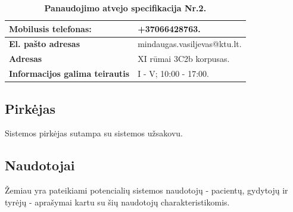 \documentclass[12pt]{article}
\begin{document}
\begin{table}[htb!]
    \captionsetup{justification=centering}
    \caption{\small\textbf{Panaudojimo atvejo specifikacija Nr.2.}}
    \begin{tabular}{|m{6cm}|m{11cm}|}
        \hline
        \raggedleft \textbf{\cellcolor{deepchampagne}Mobilusis telefonas:} &
        +37066428763. \\
        \hline
        \raggedleft \textbf{\cellcolor{deepchampagne}El. pašto adresas} &
        mindaugas.vasiljevas@ktu.lt. \\
        \hline
        \raggedleft \textbf{\cellcolor{deepchampagne}Adresas} & 
        XI rūmai 3C2b korpusas. \\
        \hline
        \raggedleft \textbf{\cellcolor{deepchampagne}Informacijos galima teirautis}
        & I - V; 10:00 - 17:00. \\
        \hline
    \end{tabular}
    \label{table:kontaktiniai_duomenys}
\end{table}

\subsection{Pirkėjas}
Sistemos pirkėjas sutampa su sistemos užsakovu.

\subsection{Naudotojai}
Žemiau yra pateikiami potencialių sistemos naudotojų - pacientų, gydytojų ir
tyrėjų - aprašymai kartu su šių naudotojų charakteristikomis.
\end{document}
